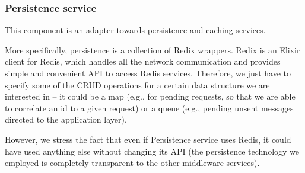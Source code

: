\subsubsection{Persistence service}

This component is an adapter towards persistence and caching services.

More specifically, persistence is a collection of Redix wrappers. Redix is an
Elixir client for Redis, which handles all the network communication and
provides simple and convenient API to access Redis services.
Therefore, we just have to specify some of the CRUD operations for a certain
data structure we are interested in -- it could be a map (e.g., for pending
requests, so that we are able to correlate an id to a given request) or a
queue (e.g., pending unsent messages directed to the application layer).

However, we stress the fact that even if Persistence service uses Redis, it
could have used anything else without changing its API (the persistence
technology we employed is completely transparent to the other middleware
services).
